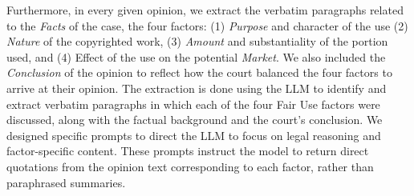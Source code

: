 Furthermore, in every given opinion, we extract the verbatim paragraphs related to the \textit{Facts} of the case, the four factors: (1) \textit{Purpose} and character of the use (2) \textit{Nature} of the copyrighted work, (3) \textit{Amount} and substantiality of the portion used, and (4) Effect of the use on the potential \textit{Market}. We also included the \textit{Conclusion} of the opinion to reflect how the court balanced the four factors to arrive at their opinion. The extraction is done using the LLM to identify and extract verbatim paragraphs in which each of the four Fair Use factors were discussed, along with the factual background and the court's conclusion. We designed specific prompts to direct the LLM to focus on legal reasoning and factor-specific content. These prompts instruct the model to return direct quotations from the opinion text corresponding to each factor, rather than paraphrased summaries. 

